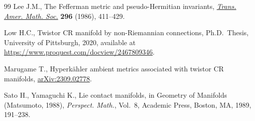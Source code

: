 \documentclass[11pt]{article}
\numberwithin{equation}{section}
\numberwithin{equation}{section}
\begin{document}
\begin{thebibliography}{99}
Lee J.M., The {F}efferman metric and pseudo-{H}ermitian invariants,
 \href{https://doi.org/10.2307/2000582}{\textit{Trans. Amer. Math. Soc.}}
 \textbf{296} (1986), 411--429.

Low H.C., Twistor {CR} manifold by non-{R}iemannian connections, Ph.D.~Thesis,
 {U}niversity of Pittsburgh, 2020, available at
 \url{https://www.proquest.com/docview/2467809346}.

Marugame T., Hyperk\"ahler ambient metrics associated with twistor {CR}
 manifolds, \href{http://arxiv.org/abs/2309.02778}{arXiv:2309.02778}.

Sato H., Yamaguchi K., Lie contact manifolds, in Geometry of Manifolds
 ({M}atsumoto, 1988), \textit{Perspect. Math.}, Vol.~8, Academic Press,
 Boston, MA, 1989, 191--238.

\end{thebibliography}
\end{document}
